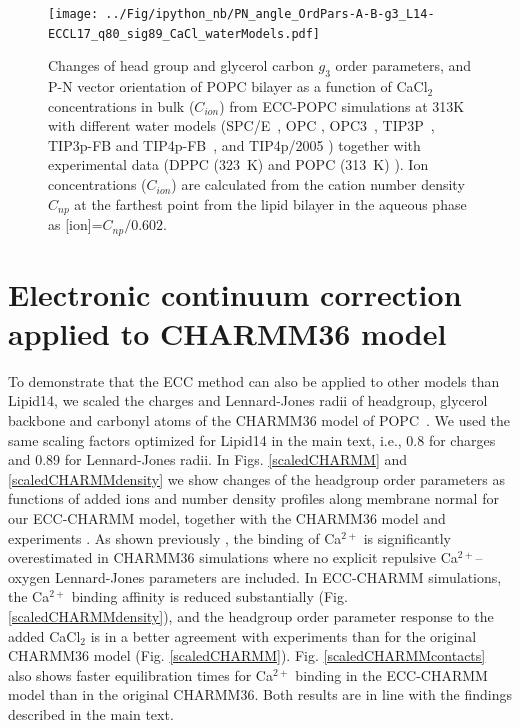 \documentclass[journal=jpcbfk]{achemso}
\begin{document}
\begin{figure}[!hp]
  \centering
  \texttt{[image: ../Fig/ipython\_nb/PN\_angle\_OrdPars-A-B-g3\_L14-ECCL17\_q80\_sig89\_CaCl\_waterModels.pdf]}
  \caption{\label{fig:ordPars_waterModels}
    Changes of head group and glycerol carbon $g_3$ order parameters, and P-N vector orientation of POPC bilayer
    as a function of CaCl$_2$ concentrations in bulk ($C_{ion}$) from ECC-POPC simulations at 313K with different
    water models (SPC/E~\cite{Berendsen1987}, OPC \cite{Izadi14}, OPC3~\cite{Izadi16}, TIP3P~\cite{jorgensen83}, TIP3p-FB and TIP4p-FB~\cite{Wang2014}, and TIP4p/2005 \cite{Abascal2005})
    together with experimental data (DPPC (323~K) \cite{akutsu81} and POPC (313~K) \cite{altenbach84}). 
    Ion concentrations ($C_{ion}$) are calculated from the cation number density $C_{np}$
    at the farthest point from the lipid bilayer in the aqueous phase as [ion]=$C_{np}/0.602$.
  }
\end{figure}

\newpage
\section{Electronic continuum correction applied to CHARMM36 model}
To demonstrate that the ECC method can also be applied to other models than Lipid14,
we scaled the charges and Lennard-Jones radii of headgroup, glycerol backbone and
carbonyl atoms of the CHARMM36 model of POPC~\cite{klauda10}. We used the
same scaling factors optimized for Lipid14 in the main text, i.e., 0.8 for charges and 0.89 for Lennard-Jones
radii. In Figs. \ref{scaledCHARMM} and \ref{scaledCHARMMdensity} we show
changes of the headgroup order parameters as functions of added ions
and number density profiles along membrane normal for our ECC-CHARMM model,
together with the CHARMM36 model \cite{catte16,charmmPOPC450mMCaClfiles}
and experiments \cite{akutsu81,altenbach84}. As shown previously \cite{catte16},
the binding of Ca$^{2+}$ is significantly overestimated in CHARMM36 simulations
where no explicit repulsive Ca$^{2+}$--oxygen Lennard-Jones parameters are included.
In ECC-CHARMM simulations, the Ca$^{2+}$ binding affinity 
is reduced substantially (Fig. \ref{scaledCHARMMdensity}), and the headgroup order parameter response to the added CaCl$_2$
is in a better agreement with experiments than for the original CHARMM36 model (Fig. \ref{scaledCHARMM}).
Fig. \ref{scaledCHARMMcontacts} also shows faster equilibration times
for Ca$^{2+}$ binding in the ECC-CHARMM model than in the original CHARMM36.
Both results are in line with the findings described in the main text.
\end{document}
